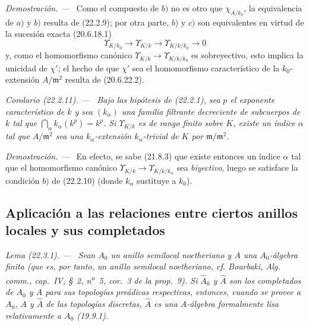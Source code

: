 \documentclass[10pt,oneside]{book}
\makeatletter
\newcommand{\setmanualcurrentlabel}[1]{\def\@currentlabel{#1}}
\newcommand{\oldpage}[2][]{%
  \setcounter{footnote}{0}%
  \marginpar{\scriptsize\textbf{#1}~|~#2}\ignorespaces}
\newenvironment{corollary}[1][]{%
  \setmanualcurrentlabel{#1}\par\medskip\noindent\itshape Corolario (#1). ---\ }{\par}
\newenvironment{lemma}[1][]{%
  \setmanualcurrentlabel{#1}\par\medskip\noindent\itshape Lema (#1). ---\ }{\par}
\newenvironment{proof}{%
  \par\medskip\noindent\textit{Demostración. ---\ }}{\par}
\makeatother
\begin{document}
\begin{proof}
Como el compuesto de $b)$ no es otro que $\chi_{A/k_0}$, la equivalencia de
$a)$ y $b)$ resulta de (22.2.9); por otra parte, $b)$ y $c)$ son equivalentes
en virtud de
la sucesión exacta (20.6.18.1)
\[
  \Upsilon_{K/k_0}\longrightarrow\Upsilon_{K/k}
  \longrightarrow\Upsilon_{K/k/k_0}\longrightarrow0
\]
y, como el homomorfismo canónico
$\Upsilon_{K/k}\to\Upsilon_{K/k/k_0}$ es sobreyectivo, esto implica la
unicidad de $\chi'$; el hecho de que $\chi'$ sea el homomorfismo característico
de la $k_0$-extensión $A/\mathfrak m^2$ resulta de (20.6.22.2).
\end{proof}

\begin{corollary}[22.2.11]
\label{0.22.2.11-es}
Bajo las hipótesis de \textup{(22.2.1)}, sea $p$ el exponente característico de $k$ y
sea $(k_\alpha)$ una familia filtrante decreciente de subcuerpos de $k$ tal
que $\bigcap_\alpha k_\alpha(k^p)=k^p$. Si $\Upsilon_{K/k}$ es de rango finito
sobre $K$, existe un índice $\alpha$ tal que $A/\mathfrak m^2$ sea una
$k_\alpha$-extensión $k_\alpha$-trivial de $K$ por
$\mathfrak m/\mathfrak m^2$.
\end{corollary}

\begin{proof}
En efecto, se sabe (21.8.3) que existe entonces un índice $\alpha$ tal que el
homomorfismo canónico $\Upsilon_{K/k}\to\Upsilon_{K/k/k_\alpha}$ sea
\emph{biyectivo}, luego se satisface la condición $b)$ de (22.2.10) (donde $k_\alpha$
sustituye a $k_0$).
\end{proof}

\oldpage[0\textsubscript{IV-1}]{191}

\subsection{Aplicación a las relaciones entre ciertos anillos locales y sus completados}
\label{subsection:0.22.3-es}

\begin{lemma}[22.3.1]
\label{0.22.3.1-es}
Sean $A_0$ un anillo semilocal noetheriano y $A$ una $A_0$-álgebra finita
(que es, por tanto, un anillo semilocal noetheriano, \textup{cf. Bourbaki,
\emph{Alg. comm.}, cap.~IV, §~2, n\textsuperscript{o}~5, cor.~3 de la
prop.~9)}. Si $\widehat A_0$ y $\widehat A$ son los completados de $A_0$ y $A$
para sus topologías preádicas respectivas, entonces, cuando se provee a
$A_0$, $A$ y $\widehat A$ de las topologías \textup{discretas}, $\widehat A$ es una
$A$-álgebra formalmente lisa relativamente a $A_0$ \textup{(19.9.1)}.
\end{lemma}
\end{document}
